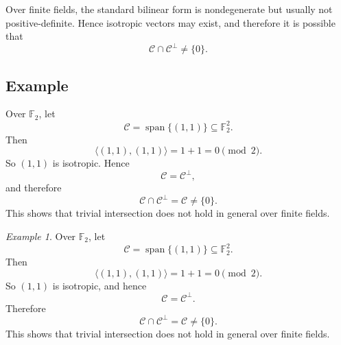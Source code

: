 \documentclass[11pt]{article}
\theoremstyle{remark}
\newtheorem{example}{Example}
\newcommand{\F}{\mathbb{F}}
\begin{document}
	Over finite fields, the standard bilinear form is nondegenerate but usually not positive-definite. Hence isotropic vectors may exist, and therefore it is possible that
	\[
	\mathcal C\cap \mathcal C^\perp\neq \{0\}.
	\]
	
	\subsection*{Example}
	
	Over \(\F_2\), let
	\[
	\mathcal C=\operatorname{span}\{(1,1)\}\subseteq \F_2^2.
	\]
	Then
	\[
	\langle (1,1),(1,1)\rangle = 1+1 = 0 \pmod 2.
	\]
	So \((1,1)\) is isotropic. Hence
	\[
	\mathcal C=\mathcal C^\perp,
	\]
	and therefore
	\[
	\mathcal C\cap \mathcal C^\perp=\mathcal C\neq \{0\}.
	\]
	This shows that trivial intersection does not hold in general over finite fields.


	\begin{example}
		Over \(\F_2\), let
		\[
		\mathcal C=\operatorname{span}\{(1,1)\}\subseteq \F_2^2.
		\]
		Then
		\[
		\langle (1,1),(1,1)\rangle = 1+1 = 0 \pmod 2.
		\]
		So \((1,1)\) is isotropic, and hence
		\[
		\mathcal C=\mathcal C^\perp.
		\]
		Therefore
		\[
		\mathcal C\cap \mathcal C^\perp=\mathcal C\neq \{0\}.
		\]
		This shows that trivial intersection does not hold in general over finite fields.
	\end{example}
\end{document}

